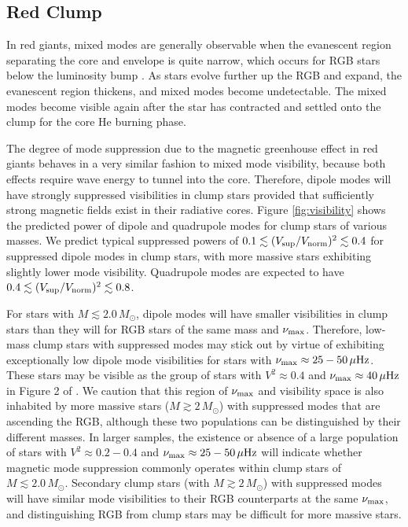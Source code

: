 \subsection{Red Clump}
\label{clump}
  

In red giants, mixed modes are generally observable when the evanescent region separating the core and envelope is quite narrow, which occurs for RGB stars below the luminosity bump \citep{Dupret_2009,Grosjean_2014}. As stars evolve further up the RGB and expand, the evanescent region thickens, and mixed modes become undetectable. The mixed modes become visible again after the star has contracted and settled onto the clump for the core He burning phase. 

The degree of mode suppression due to the magnetic greenhouse effect in red giants behaves in a very similar fashion to mixed mode visibility, because both effects require wave energy to tunnel into the core. Therefore, dipole modes will have strongly suppressed visibilities in clump stars provided that sufficiently strong magnetic fields exist in their radiative cores. Figure \ref{fig:visibility} shows the predicted power of dipole and quadrupole modes for clump stars of various masses. We predict typical suppressed powers of $0.1 \lesssim (V_{\rm sup}/V_{\rm norm})^2 \lesssim 0.4$ for suppressed dipole modes in clump stars, with more massive stars exhibiting slightly lower mode visibility. Quadrupole modes are expected to have $0.4 \lesssim (V_{\rm sup}/V_{\rm norm})^2 \lesssim 0.8$. 

For stars with $M \lesssim 2.0 \, M_\odot$, dipole modes will have smaller visibilities in clump stars than they will for RGB stars of the same mass and $\nu_{\rm max}$. Therefore, low-mass clump stars with suppressed modes may stick out by virtue of exhibiting exceptionally low dipole mode visibilities for stars with $\nu_{\rm max} \approx 25-50 \, \mu {\rm Hz}$. These stars may be visible as the group of stars with $V^2 \approx 0.4$ and $\nu_{\rm max} \approx 40 \, \mu {\rm Hz}$ in Figure 2 of \cite{Fuller_2015}. We caution that this region of $\nu_{\rm max}$ and visibility space is also inhabited by more massive stars ($M \gtrsim 2 \, M_\odot$) with suppressed modes that are ascending the RGB, although these two populations can be distinguished by their different masses. In larger samples, the existence or absence of a large population of stars with $V^2 \approx 0.2-0.4$ and $\nu_{\rm max} \approx 25-50 \, \mu {\rm Hz}$ will indicate whether magnetic mode suppression commonly operates within clump stars of $M \lesssim 2.0 \, M_\odot$. Secondary clump stars (with $M \gtrsim 2 \, M_\odot$) with suppressed modes will have similar mode visibilities to their RGB counterparts at the same $\nu_{\rm max}$, and distinguishing RGB from clump stars may be difficult for more massive stars.
  
  
  
  
  
  
  
  
  